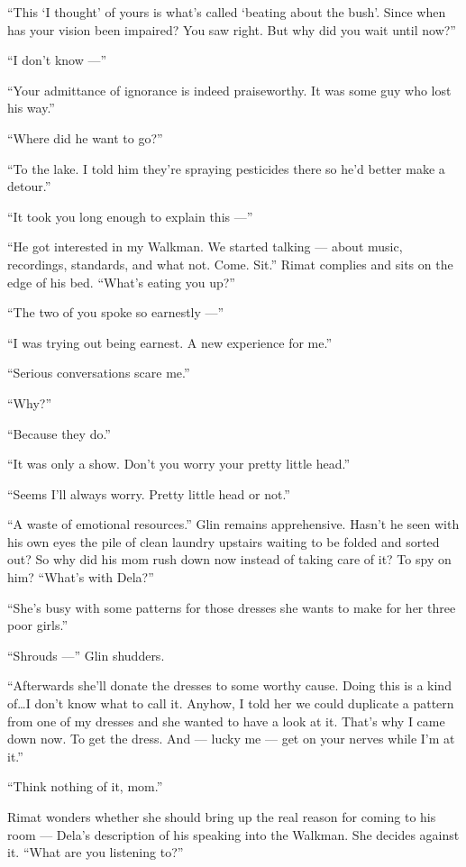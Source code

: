\documentclass[twoside,11pt,openany]{book}
\begin{document}
``This `I thought' of yours is what's called `beating about the bush'. Since when has your vision been
impaired? You saw right. But why did you wait until now?''

``I don't know ---''

``Your admittance of ignorance is indeed praiseworthy. It was some guy who lost his way.''

``Where did he want to go?''

``To the lake. I told him they're spraying pesticides there so he'd better make a detour.''

``It took you long enough to explain this ---''

``He got interested in my Walkman. We started talking --- about music, recordings, standards, and what not.
Come. Sit.'' Rimat complies and sits on the edge of his bed.  ``What's eating you
up?''

``The two of you spoke so earnestly ---''

``I was trying out being earnest. A new experience for me.''

``Serious conversations scare me.''

``Why?''

``Because they do.''

``It was only a show. Don't you worry your pretty little  head.''

``Seems I'll always worry. Pretty little head or not.''

``A waste of emotional resources.'' Glin remains apprehensive. Hasn't he seen with his own
eyes the pile of clean laundry upstairs waiting to be folded and sorted out? So why did his mom rush down now instead
of taking care of it? To spy on him? ``What's with Dela?''

``She's busy with some patterns for those dresses she wants to make for her three poor
girls.''

``Shrouds ---'' Glin shudders.

``Afterwards she'll donate the dresses to some worthy cause. Doing this is a kind of{\ldots}I don't know
what to call it. Anyhow, I told her we could duplicate a pattern from one of my dresses and she wanted to have a look at
it. That's why I came down now. To get the dress. And --- lucky me --- get on your nerves while I'm at it.''

``Think nothing of it, mom.''

Rimat wonders whether she should bring up the real reason for coming to his room --- Dela's description of his speaking
into the Walkman. She decides against it. ``What are you listening to?''
\end{document}

